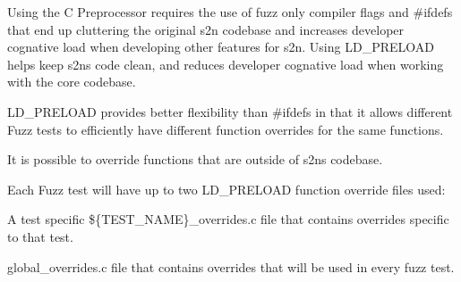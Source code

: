\begin{DoxyEnumerate}
\item Using the C Preprocessor requires the use of fuzz only compiler flags and {\ttfamily \#ifdef}\textquotesingle{}s that end up cluttering the original s2n codebase and increases developer cognative load when developing other features for s2n. Using {\ttfamily L\+D\+\_\+\+P\+R\+E\+L\+O\+AD} helps keep s2n\textquotesingle{}s code clean, and reduces developer cognative load when working with the core codebase.
\item {\ttfamily L\+D\+\_\+\+P\+R\+E\+L\+O\+AD} provides better flexibility than {\ttfamily \#ifdef}\textquotesingle{}s in that it allows different Fuzz tests to efficiently have different function overrides for the same functions.
\item It is possible to override functions that are outside of s2n\textquotesingle{}s codebase.
\end{DoxyEnumerate}

Each Fuzz test will have up to two {\ttfamily L\+D\+\_\+\+P\+R\+E\+L\+O\+AD} function override files used\+:


\begin{DoxyEnumerate}
\item A test specific {\ttfamily \$\{T\+E\+S\+T\+\_\+\+N\+A\+ME\}\+\_\+overrides.\+c} file that contains overrides specific to that test.
\item {\ttfamily global\+\_\+overrides.\+c} file that contains overrides that will be used in every fuzz test. 
\end{DoxyEnumerate}